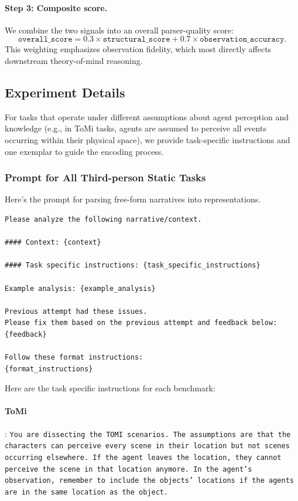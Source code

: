 \paragraph{Step 3: Composite score.}
We combine the two signals into an overall parser-quality score:
\[
\texttt{overall\_score} = 0.3 \times \texttt{structural\_score} + 0.7 \times \texttt{observation\_accuracy}.
\]
This weighting emphasizes observation fidelity, which most directly affects downstream theory-of-mind reasoning.

\subsection{Experiment Details}
\label{app:experiment_details}

For tasks that operate under different assumptions about agent perception and knowledge (e.g., in ToMi tasks, agents are assumed to perceive all events occurring within their physical space), we provide task-specific instructions and one exemplar to guide the encoding process.

\subsubsection{Prompt for All Third-person Static Tasks}
Here's the prompt for parsing free-form narratives into \protocolname representations. 

\begin{lstlisting}
Please analyze the following narrative/context.

#### Context: {context}

#### Task specific instructions: {task_specific_instructions}

Example analysis: {example_analysis}

Previous attempt had these issues. 
Please fix them based on the previous attempt and feedback below:
{feedback}

Follow these format instructions:
{format_instructions}
\end{lstlisting}

Here are the task specific instructions for each benchmark:

\paragraph{ToMi}: \texttt{You are dissecting the TOMI scenarios. The assumptions are that the characters can perceive every scene in their location but not scenes occurring elsewhere. If the agent leaves the location, they cannot perceive the scene in that location anymore. In the agent's observation, remember to include the objects' locations if the agents are in the same location as the object.}

